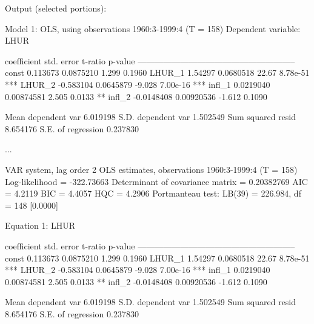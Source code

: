 \begin{script}[htbp]

Output (selected portions):
\begin{outbit}
Model 1: OLS, using observations 1960:3-1999:4 (T = 158)
Dependent variable: LHUR

             coefficient   std. error   t-ratio   p-value 
  --------------------------------------------------------
  const       0.113673     0.0875210     1.299    0.1960  
  LHUR_1      1.54297      0.0680518    22.67     8.78e-51 ***
  LHUR_2     -0.583104     0.0645879    -9.028    7.00e-16 ***
  infl_1      0.0219040    0.00874581    2.505    0.0133   **
  infl_2     -0.0148408    0.00920536   -1.612    0.1090  

Mean dependent var   6.019198   S.D. dependent var   1.502549
Sum squared resid    8.654176   S.E. of regression   0.237830

...

VAR system, lag order 2
OLS estimates, observations 1960:3-1999:4 (T = 158)
Log-likelihood = -322.73663
Determinant of covariance matrix = 0.20382769
AIC = 4.2119
BIC = 4.4057
HQC = 4.2906
Portmanteau test: LB(39) = 226.984, df = 148 [0.0000]

Equation 1: LHUR

             coefficient   std. error   t-ratio   p-value 
  --------------------------------------------------------
  const       0.113673     0.0875210     1.299    0.1960  
  LHUR_1      1.54297      0.0680518    22.67     8.78e-51 ***
  LHUR_2     -0.583104     0.0645879    -9.028    7.00e-16 ***
  infl_1      0.0219040    0.00874581    2.505    0.0133   **
  infl_2     -0.0148408    0.00920536   -1.612    0.1090  

Mean dependent var   6.019198   S.D. dependent var   1.502549
Sum squared resid    8.654176   S.E. of regression   0.237830
\end{outbit}
\end{script}

